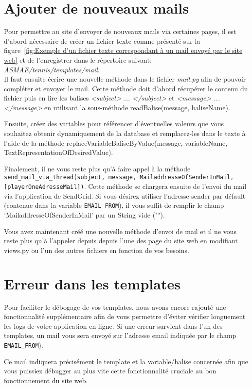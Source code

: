 \section{Ajouter de nouveaux mails}

Pour permettre au site d'envoyer de nouveaux mails via certaines pages, il est d'abord nécessaire de créer un fichier texte comme présenté sur la figure~\ref{fig:Exemple d'un fichier texte correspondant à un mail envoyé par le site web} et de l'enregistrer dans le répertoire suivant: \textit{ASMAE/tennis/templates/mail}.\\

Il faut ensuite écrire une nouvelle méthode dans le fichier \textit{mail.py} afin de pouvoir compléter et envoyer le mail. Cette méthode doit d'abord récupérer le contenu du fichier
 puis en lire les balises \textit{<subject> ... </subject>} et 
 \textit{<message> ... </message>} en utilisant la
sous-méthode readBalise(message, baliseName). \newline

Ensuite, créez des variables pour référencer d'éventuelles valeurs que vous souhaitez 
obtenir dynamiquement de la database et remplacez-les dans le texte à l'aide de la méthode 
replaceVariableBaliseByValue(message, variableName, TextRepresentationOfDesiredValue).\newline

Finalement, il ne vous reste plus qu'à faire appel à la méthode \verb|send_mail_via_thread(subject, message, MailaddresseOfSenderInMail, [playerOneAdresseMail])|.
Cette méthode se chargera ensuite de l'envoi du mail via l'application de SendGrid. 
Si vous désirez utiliser l'adresse sender par défault (contenue dans la variable 
\verb|EMAIL_FROM|), il vous suffit de remplir le champ 'MailaddresseOfSenderInMail' par
un String vide (""). \newline

Vous avez maintenant créé une nouvelle méthode d'envoi de mail et il ne vous reste 
plus qu'à l'appeler depuis depuis l'une des page du site web en modifiant views.py ou
l'un des autres fichiers en fonction de vos besoins.

\section{Erreur dans les templates}

Pour faciliter le débogage de vos templates, nous avons encore rajouté une fonctionnalité
supplémentaire afin de vous permettre d'éviter vérifier longuement les logs de 
votre application en ligne. Si une erreur survient dans l'un des templates, un mail
vous sera envoyé sur l'adresse email indiquée par le champ \verb|EMAIL_FROM|).
\newline

Ce mail indiquera précisément le template et la variable/balise concernée afin que vous
puissiez débugger au plus vite cette fonctionnalité cruciale au bon fonctionnement du
site web.
